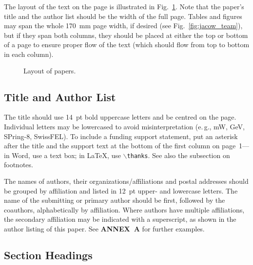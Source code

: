 \documentclass[a4paper,
               keeplastbox,   %
               ]{jacow}
\begin{document}
The layout of the text on the page is illustrated in
Fig.~\ref{fig:paper_layout}. Note that the paper’s title and the author list should
be the width of the full page. Tables and figures may span
the whole \SI{170}{mm} page width, if desired (see Fig.~\ref{fig:jacow_team}), but
if they span both columns, they should be placed at either
the top or bottom of a page to ensure proper flow of the
text (which should flow from top to bottom in each column).

\begin{figure}[!htb]
   \centering
   \caption{Layout of papers.}
   \label{fig:paper_layout}
\end{figure}

\begin{figure*}[!tbh]
    \centering

    \caption{Example of a full-width figure showing the JACoW Team at their annual
    	     meeting in December 2018. This figure has a multi-line caption that has to be
    	     justified rather than centred.}
    \label{fig:jacow_team}
\end{figure*}

\subsection{Title and Author List}

The title should use \SI{14}{pt} bold uppercase letters and be centred on the page.
Individual letters may be lowercased to avoid misinterpretation (e.\,g., mW, GeV, 
SPring-8, SwissFEL).
To include a funding support statement, put an asterisk after the title and
the support text at the bottom of the first column on page~1---in Word,
use a text box; in \LaTeX, use $\backslash$\texttt{thanks}. See also the
subsection on footnotes.

The names of authors, their organizations/affiliations and
postal addresses should be grouped by affiliation and
listed in \SI{12}{pt} upper- and lowercase letters. The name of
the submitting or primary author should be first, followed
by the coauthors, alphabetically by affiliation. Where
authors have multiple affiliations, the secondary affiliation
may be indicated with a superscript, as shown in the
author listing of this paper. See \textbf{ANNEX~A} for further examples.

\subsection{Section Headings}
\end{document}
